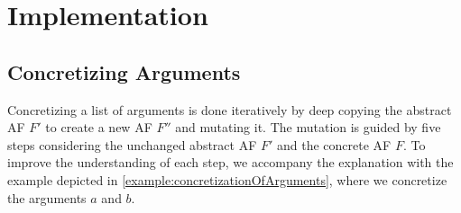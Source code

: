 \chapter{Implementation}

\section{Concretizing Arguments}
Concretizing a list of arguments is done iteratively by deep copying the abstract AF $F'$ to create a new AF $F''$ and mutating it. The mutation is guided by five steps considering the unchanged abstract AF $F'$ and the concrete AF $F$. To improve the understanding of each step, we accompany the explanation with the example depicted in \ref{example:concretizationOfArguments}, where we concretize the arguments $a$ and $b$.

